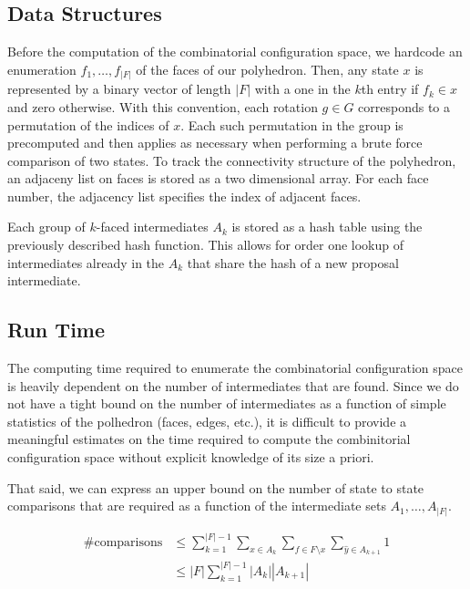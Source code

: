 \subsection{Data Structures}

Before the computation of the combinatorial configuration space, we hardcode an enumeration $f_1, \dots, f_{|F|}$ of the faces of our polyhedron. Then, any state $x$ is represented by a binary vector of length $|F|$ with a one in the $k$th entry if $f_k \in x$ and zero otherwise. With this convention, each rotation $g \in G$ corresponds to a permutation of the indices of $x$. Each such permutation in the group is precomputed and then applies as necessary when performing a brute force comparison of two states. To track the connectivity structure of the polyhedron, an adjaceny list on faces is stored as a two dimensional array. For each face number, the adjacency list specifies the index of adjacent faces.

Each group of $k$-faced intermediates $A_k$ is stored as a hash table using the previously described hash function. This allows for order one lookup of intermediates already in the $A_k$ that share the hash of a new proposal intermediate. 

\subsection{Run Time}

The computing time required to enumerate the combinatorial configuration space is heavily dependent on the number of intermediates that are found. Since we do not have a tight bound on the number of intermediates as a function of simple statistics of the polhedron (faces, edges, etc.), it is difficult to provide a meaningful estimates on the time required to compute the combinitorial configuration space without explicit knowledge of its size a priori.

That said, we can express an upper bound on the number of state to state comparisons that are required as a function of the intermediate sets $A_1,\dots,A_{|F|}$. 

\begin{align}
\#\text{comparisons} &\leq \sum_{k=1}^{|F|-1} \sum_{x \in A_k} \sum_{f \in F\setminus x} \sum_{\hat{y} \in A_{k+1}} 1 \\
&\leq |F|\sum_{k=1}^{|F|-1}|A_k||A_{k+1}| 
\end{align}
